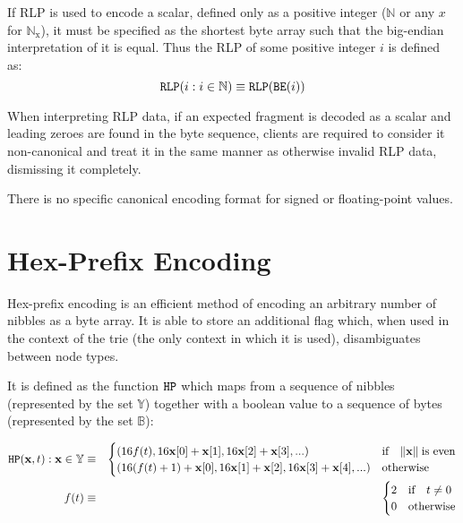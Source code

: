 \documentclass[9pt,oneside]{amsart}
\begin{document}
If RLP is used to encode a scalar, defined only as a positive integer ($\mathbb{N}$ or any $x$ for $\mathbb{N}_{\mathrm{x}}$), it must be specified as the shortest byte array such that the big-endian interpretation of it is equal. Thus the RLP of some positive integer $i$ is defined as:
\begin{equation}
\mathtt{\tiny RLP}(i : i \in \mathbb{N}) \equiv \mathtt{\tiny RLP}(\mathtt{\tiny BE}(i))
\end{equation}

When interpreting RLP data, if an expected fragment is decoded as a scalar and leading zeroes are found in the byte sequence, clients are required to consider it non-canonical and treat it in the same manner as otherwise invalid RLP data, dismissing it completely.

There is no specific canonical encoding format for signed or floating-point values.

\section{Hex-Prefix Encoding}\label{app:hexprefix}
Hex-prefix encoding is an efficient method of encoding an arbitrary number of nibbles as a byte array. It is able to store an additional flag which, when used in the context of the trie (the only context in which it is used), disambiguates between node types.

It is defined as the function $\mathtt{\tiny HP}$ which maps from a sequence of nibbles (represented by the set $\mathbb{Y}$) together with a boolean value to a sequence of bytes (represented by the set $\mathbb{B}$):

\begin{eqnarray}
\mathtt{\tiny HP}(\mathbf{x}, t): \mathbf{x} \in \mathbb{Y} & \equiv & \begin{cases}
(16f(t), 16\mathbf{x}[0] + \mathbf{x}[1], 16\mathbf{x}[2] + \mathbf{x}[3], ...) &
\text{if} \quad \lVert \mathbf{x} \rVert \; \text{is even} \\
(16(f(t) + 1) + \mathbf{x}[0], 16\mathbf{x}[1] + \mathbf{x}[2], 16\mathbf{x}[3] + \mathbf{x}[4], ...) &
\text{otherwise}
\end{cases} \\
f(t) & \equiv & \begin{cases} 2 & \text{if} \quad t \neq 0 \\ 0 & \text{otherwise} \end{cases}
\end{eqnarray}
\end{document}

